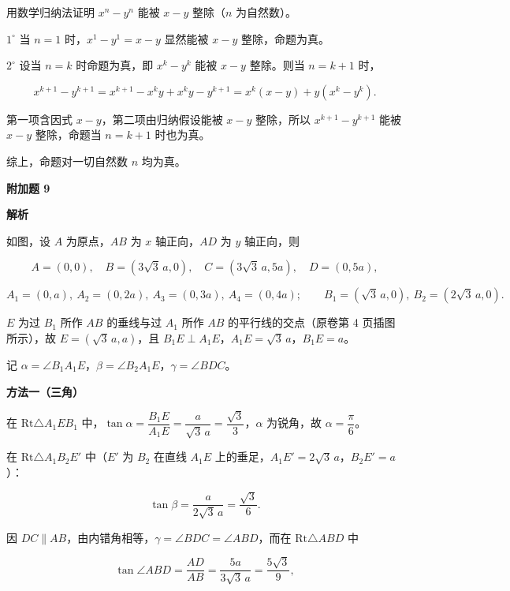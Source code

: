 \begin{answer}

用数学归纳法证明 $x^n-y^n$ 能被 $x-y$ 整除（$n$ 为自然数）。

$1^\circ$ 当 $n=1$ 时，$x^1-y^1=x-y$ 显然能被 $x-y$ 整除，命题为真。

$2^\circ$ 设当 $n=k$ 时命题为真，即 $x^k-y^k$ 能被 $x-y$ 整除。则当 $n=k+1$ 时，

\nopagebreak[4]
\[
x^{k+1}-y^{k+1}
=x^{k+1}-x^ky+x^ky-y^{k+1}
=x^k(x-y)+y(x^k-y^k).
\]

第一项含因式 $x-y$，第二项由归纳假设能被 $x-y$ 整除，所以 $x^{k+1}-y^{k+1}$ 能被 $x-y$ 整除，命题当 $n=k+1$ 时也为真。

综上，命题对一切自然数 $n$ 均为真。

\textbf{附加题 9}

\textbf{解析}

如图，设 $A$ 为原点，$AB$ 为 $x$ 轴正向，$AD$ 为 $y$ 轴正向，则

\nopagebreak[4]
\[
A=(0,0),\quad
B=(3\sqrt3\,a,0),\quad
C=(3\sqrt3\,a,5a),\quad
D=(0,5a),
\]

\nopagebreak[4]
\[
A_1=(0,a),\ A_2=(0,2a),\ A_3=(0,3a),\ A_4=(0,4a);
\qquad
B_1=(\sqrt3\,a,0),\ B_2=(2\sqrt3\,a,0).
\]

$E$ 为过 $B_1$ 所作 $AB$ 的垂线与过 $A_1$ 所作 $AB$ 的平行线的交点（原卷第 4 页插图所示），故 $E=(\sqrt3\,a,a)$，且 $B_1E\perp A_1E$，$A_1E=\sqrt3\,a$，$B_1E=a$。
\nopagebreak[4]
\begin{center}\end{center}
\nopagebreak[4]
记 $\alpha=\angle B_1A_1E$，$\beta=\angle B_2A_1E$，$\gamma=\angle BDC$。

\textbf{方法一（三角）}

在 $\mathrm{Rt}\triangle A_1EB_1$ 中，$\tan\alpha=\dfrac{B_1E}{A_1E}=\dfrac{a}{\sqrt3\,a}=\dfrac{\sqrt3}{3}$，$\alpha$ 为锐角，故 $\alpha=\dfrac{\pi}{6}$。

在 $\mathrm{Rt}\triangle A_1B_2E'$ 中（$E'$ 为 $B_2$ 在直线 $A_1E$ 上的垂足，$A_1E'=2\sqrt3\,a$，$B_2E'=a$）：

\nopagebreak[4]
\[
\tan\beta=\frac{a}{2\sqrt3\,a}=\frac{\sqrt3}{6}.
\]

因 $DC\parallel AB$，由内错角相等，$\gamma=\angle BDC=\angle ABD$，而在 $\mathrm{Rt}\triangle ABD$ 中

\nopagebreak[4]
\[
\tan\angle ABD=\frac{AD}{AB}=\frac{5a}{3\sqrt3\,a}=\frac{5\sqrt3}{9},
\]


\end{answer}
